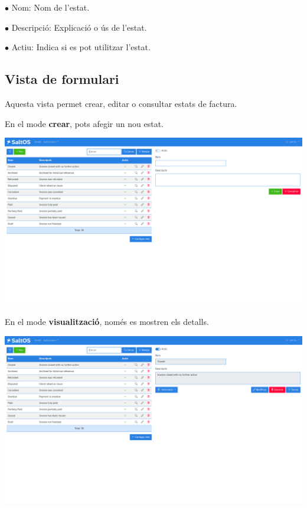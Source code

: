 \documentclass[a4paper]{article}
\begin{document}
\begin{compactitem}
\item[\color{myblue}$\bullet$] Nom: Nom de l'estat.
\item[\color{myblue}$\bullet$] Descripció: Explicació o ús de l'estat.
\item[\color{myblue}$\bullet$] Actiu: Indica si es pot utilitzar l'estat.
\end{compactitem}

\hypertarget{toc144}{}
\subsection{Vista de formulari}

Aquesta vista permet crear, editar o consultar estats de factura.

En el mode \textbf{crear}, pots afegir un nou estat.

\begin{center}\includegraphics[width=1\textwidth]{../ujest/snaps/test-screenshots-js-screenshots-sales-invoices-status-create-ca-es-1-snap.png}\end{center}

En el mode \textbf{visualització}, només es mostren els detalls.

\begin{center}\includegraphics[width=1\textwidth]{../ujest/snaps/test-screenshots-js-screenshots-sales-invoices-status-view-10-ca-es-1-snap.png}\end{center}
\end{document}
